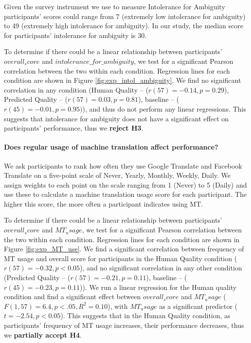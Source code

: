 Given the survey instrument we use to measure Intolerance for Ambiguity\cite{gellerTolerance1993} participants’ scores could range from 7 (extremely low intolerance for ambiguity) to 49 (extremely high intolerance for ambiguity). In our study, the median score for participants' intolerance for ambiguity is 30. 

To determine if there could be a linear relationship between participants' $overall_score$ and $intolerance\_for\_ambiguity$, we test for a significant Pearson correlation between the two within each condition. Regression lines for each condition are shown in Figure \ref{fig:exp_intol_ambiguity}. We find no significant correlation in any condition (Human Quality -- ($r(57) = -0.14, p = 0.29$), Predicted Quality -- ($r(57) = 0.03, p = 0.81$), baseline -- ($r(45) = -0.01, p = 0.95)$), and thus do not perform any linear regressions. This suggests that intolerance for ambiguity does not have a significant effect on participants' performance, thus we \textbf{reject H3}. 

\paragraph{\textbf{Does regular usage of machine translation affect performance?}}

We ask participants to rank how often they use Google Translate and Facebook Translate on a five-point scale of Never, Yearly, Monthly, Weekly, Daily. We assign weights to each point on the scale ranging from 1 (Never) to 5 (Daily) and use these to calculate a machine translation usage score for each participant. The higher this score, the more often a participant indicates using MT. 

To determine if there could be a linear relationship between participants' $overall_score$ and $MT_usage$, we test for a significant Pearson correlation between the two within each condition.
Regression lines for each condition are shown in Figure \ref{fig:exp_MT_use}. We find a significant correlation between frequency of MT usage and overall score for participants in the Human Quality condition ($r(57) = -0.32, p < 0.05$), and no significant correlation in any other condition (Predicted Quality -- ($r(57) = -0.21, p = 0.11$), baseline -- ($r(45) = -0.23, p = 0.11$)). We run a linear regression for the Human quality condition and find a significant effect between $overall_score$ and $MT_usage$ ($F(1, 57) = 6.4, p < .05, R^2 = 0.10$), with $MT_usage$ as a significant predictor ($t = -2.54, p < 0.05$). This suggests that in the Human Quality condition, as participants’ frequency of MT usage increases, their performance decreases, thus we \textbf{partially accept H4}.

